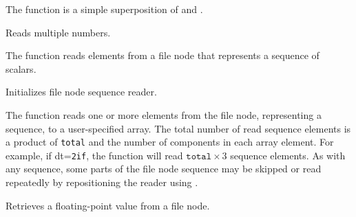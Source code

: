 The function is a simple superposition of  and .


Reads multiple numbers.


\begin{description}
\end{description}

The function reads elements from a file node that represents a sequence of scalars.

Initializes file node sequence reader.


\begin{description}
\end{description}

The function reads one or more elements from
the file node, representing a sequence, to a user-specified array. The
total number of read sequence elements is a product of \texttt{total}
and the number of components in each array element. For example, if
dt=\texttt{2if}, the function will read $\texttt{total} \times 3$
sequence elements. As with any sequence, some parts of the file node
sequence may be skipped or read repeatedly by repositioning the reader
using .


Retrieves a floating-point value from a file node.

